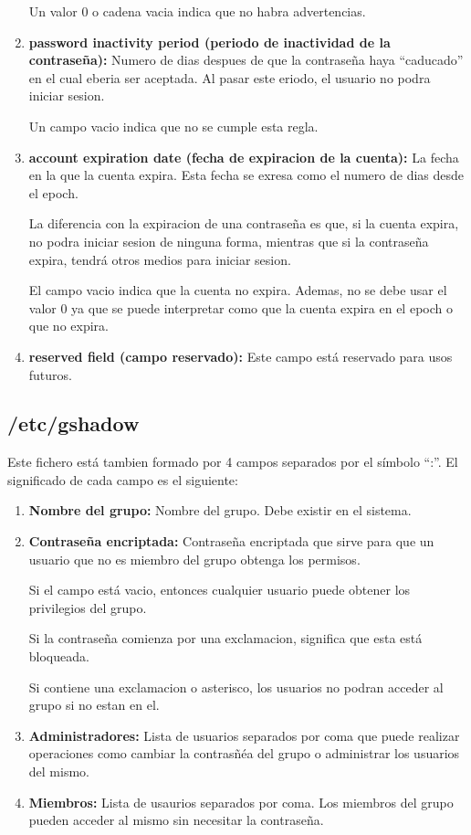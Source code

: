 \documentclass{article}
\begin{document}
\begin{enumerate}
    Un valor 0 o cadena vacia indica que no habra advertencias.

    \item \textbf{password inactivity period (periodo de inactividad de la contraseña): }Numero de dias despues de que la contraseña haya ``caducado'' en el cual eberia ser aceptada. Al pasar este eriodo, el usuario no podra iniciar sesion.
    
    Un campo vacio indica que no se cumple esta regla.

    \item  \textbf{account expiration date (fecha de expiracion de la cuenta): }La fecha en la que la cuenta expira. Esta fecha se exresa como el numero de dias desde el epoch.
    
    La diferencia con la expiracion de una contraseña es que, si la cuenta expira, no podra iniciar sesion de ninguna forma, mientras que si la contraseña expira, tendrá otros medios para iniciar sesion.

    El campo vacio indica que la cuenta no expira. Ademas, no se debe usar el valor 0 ya que se puede interpretar como que la cuenta expira en el epoch o que no expira.

    \item \textbf{reserved field (campo reservado): }Este campo está reservado para usos futuros.
\end{enumerate}

\subsection{/etc/gshadow}
Este fichero está tambien formado por 4 campos separados por el símbolo ``:''. El significado de cada campo es el siguiente:

\begin{enumerate}
    \item \textbf{Nombre del grupo: }Nombre del grupo. Debe existir en el sistema.
    \item \textbf{Contraseña encriptada: }Contraseña encriptada que sirve para que un usuario que no es miembro del grupo obtenga los permisos.
    
    Si el campo está vacio, entonces cualquier usuario puede obtener los privilegios del grupo.

    Si la contraseña comienza por una exclamacion, significa que esta está bloqueada.

    Si contiene una exclamacion o asterisco, los usuarios no podran acceder al grupo si no estan en el.

    \item \textbf{Administradores: }Lista de usuarios separados por coma que puede realizar operaciones como cambiar la contrasñéa del grupo o administrar los usuarios del mismo.
    \item \textbf{Miembros: }Lista de usaurios separados por coma. Los miembros del grupo pueden acceder al mismo sin necesitar la contraseña.
\end{enumerate}
\end{document}
